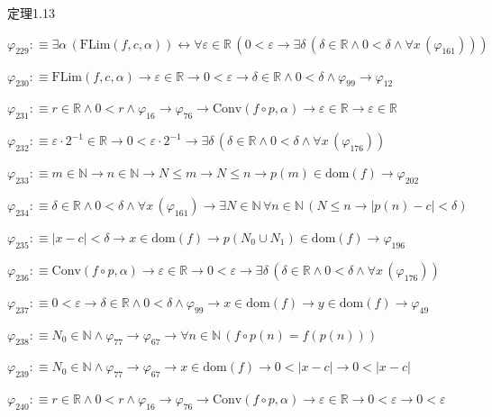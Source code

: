 \begin{fullproof}{定理1.13}
\begin{abbrevlist}
\item $\varphi_{229} :\equiv \exists \alpha\,(\mathrm{FLim}(f,c,\alpha)) \leftrightarrow \forall \varepsilon \in \mathbb{R}\,(0 < \varepsilon \to \exists \delta\,(\delta \in \mathbb{R} \land 0 < \delta \land \forall x\,(\varphi_{161})))$
\item $\varphi_{230} :\equiv \mathrm{FLim}(f,c,\alpha) \to \varepsilon \in \mathbb{R} \to 0 < \varepsilon \to \delta \in \mathbb{R} \land 0 < \delta \land \varphi_{99} \to \varphi_{12}$
\item $\varphi_{231} :\equiv r \in \mathbb{R} \land 0 < r \land \varphi_{16} \to \varphi_{76} \to \mathrm{Conv}(f \circ p,\alpha) \to \varepsilon \in \mathbb{R} \to \varepsilon \in \mathbb{R}$
\item $\varphi_{232} :\equiv \varepsilon \cdot 2^{-1} \in \mathbb{R} \to 0 < \varepsilon \cdot 2^{-1} \to \exists \delta\,(\delta \in \mathbb{R} \land 0 < \delta \land \forall x\,(\varphi_{176}))$
\item $\varphi_{233} :\equiv m \in \mathbb{N} \to n \in \mathbb{N} \to N \leq m \to N \leq n \to p(m) \in \mathrm{dom}(f) \to \varphi_{202}$
\item $\varphi_{234} :\equiv \delta \in \mathbb{R} \land 0 < \delta \land \forall x\,(\varphi_{161}) \to \exists N \in \mathbb{N}\,\forall n \in \mathbb{N}\,(N \leq n \to \lvert p(n) - c \rvert < \delta)$
\item $\varphi_{235} :\equiv \lvert x - c \rvert < \delta \to x \in \mathrm{dom}(f) \to p(N_{0} \cup N_{1}) \in \mathrm{dom}(f) \to \varphi_{196}$
\item $\varphi_{236} :\equiv \mathrm{Conv}(f \circ p,\alpha) \to \varepsilon \in \mathbb{R} \to 0 < \varepsilon \to \exists \delta\,(\delta \in \mathbb{R} \land 0 < \delta \land \forall x\,(\varphi_{176}))$
\item $\varphi_{237} :\equiv 0 < \varepsilon \to \delta \in \mathbb{R} \land 0 < \delta \land \varphi_{99} \to x \in \mathrm{dom}(f) \to y \in \mathrm{dom}(f) \to \varphi_{49}$
\item $\varphi_{238} :\equiv N_{0} \in \mathbb{N} \land \varphi_{77} \to \varphi_{67} \to \forall n \in \mathbb{N}\,(f \circ p(n) = f(p(n)))$
\item $\varphi_{239} :\equiv N_{0} \in \mathbb{N} \land \varphi_{77} \to \varphi_{67} \to x \in \mathrm{dom}(f) \to 0 < \lvert x - c \rvert \to 0 < \lvert x - c \rvert$
\item $\varphi_{240} :\equiv r \in \mathbb{R} \land 0 < r \land \varphi_{16} \to \varphi_{76} \to \mathrm{Conv}(f \circ p,\alpha) \to \varepsilon \in \mathbb{R} \to 0 < \varepsilon \to 0 < \varepsilon$

\end{abbrevlist}
\end{fullproof}
